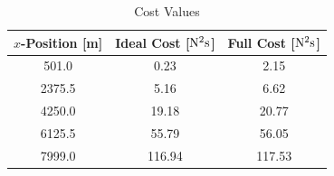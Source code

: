 \documentclass[twocolumn,letterpaper]{IEEEAerospaceCLS}  %
\theoremstyle{definition}
\begin{document}

\begin{table}[] 
\caption{Cost Values }
\begin{center}
\begin{tabular}{c|cc}\label{tab: cost comparison}
$x$-Position [m] & Ideal Cost [$\rm N^2s$] & Full Cost [$\rm N^2s$]  \\
\hline 
501.0 & 0.23 & 2.15 \\
2375.5 & 5.16 & 6.62 \\
4250.0 & 19.18 & 20.77 \\
6125.5 & 55.79 & 56.05 \\
7999.0 & 116.94 & 117.53
\end{tabular}
\end{center}
\end{table}
\end{document}
